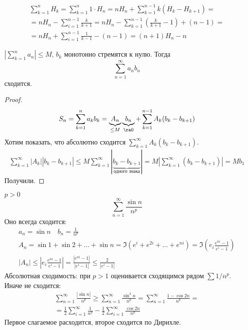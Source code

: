 \begin{exmp}
	\begin{gather*}
		\sum_{k=1}^n H_k = \sum_{k=1}^n 1 \cdot H_n = n H_n + \sum_{k=1}^{n-1} k(H_k - H_{k+1}) = \\
		= n H_n - \sum_{i=1}^{n-1} \frac{k}{k+1} = n H_n - \sum_{k=1}^{n-1} \left(\frac{k}{k+1} - 1\right) + (n - 1) = \\
		= n H_n + \sum_{i=1}^{n-1} \frac1{k-1} - (n-1) = (n+1) H_n - n
	\end{gather*}
\end{exmp}

\begin{theorem}
	$\left| \sum_{k=1}^n a_n \right| \le M$, $b_k$ монотонно стремятся к нулю.
	Тогда
	\[ \sum_{n=1}^\infty a_n b_n \]
	сходится.
\end{theorem}
\begin{proof}
	\begin{gather*}
		S_n = \sum_{k=1}^n a_kb_k = \underbrace{A_n}_{\le M}\underbrace{b_n}_{\ra 0} + \sum_{k=1}^{n-1} A_k(b_k - b_{k+1})
	\end{gather*}
	Хотим показать, что абсолютно сходится $\sum_{k=1}^\infty A_k(b_k - b_{k+1})$.
	\begin{gather*}
		\sum_{k=1}^\infty |A_k||b_k - b_{k+1}|
		\le M \sum_{k=1}^\infty |\underbrace{b_k - b_{k+1}}_{\text{одного знака}}|
		= M|\sum_{k=1}^\infty (b_k - b_{k+1})|
		= Mb_1
	\end{gather*}
	Получили.
\end{proof}

\begin{exmp}
	$p > 0$
	\[ \sum_{n=1}^\infty \frac{\sin n}{n^p} \]
	Оно всегда сходится:
	\begin{gather*}
		a_n = \sin n \quad b_n = \frac1{n^p} \\
		A_n = \sin 1 + \sin 2 + \dots + \sin n = \Im (e^i + e^{2i} + \dots + e^{ni}) = \Im \left( e_i \frac{e^{ni} - 1}{e^i - 1} \right) \\
		|A_n|  \le \left| e_i \frac{e^{ni} - 1}{e^i - 1} \right| = \frac{|e^{ni} - 1|}{|e^i - 1|} \le \frac2{|e^i - 1|}
	\end{gather*}
	Абсолютная сходимость: при $p > 1$ оценивается сходящимся рядом $\sum 1/n^p$. Иначе не сходится:
	\begin{gather*}
		\sum_{n=1}^\infty \frac{|\sin n|}{n^p} \ge \sum_{n=1}^\infty \frac{\sin^2 n}{n^p} = \sum_{n=1}^\infty \frac{1 - \cos 2n}{n^p} = \\
		= \frac12 \sum_{i=1}^\infty \frac1{n^p} - \frac12 \sum_{i=1}^\infty \frac{\cos 2n}{n^p}
	\end{gather*}
	Первое слагаемое расходится, второе сходится по Дирихле.
\end{exmp}

